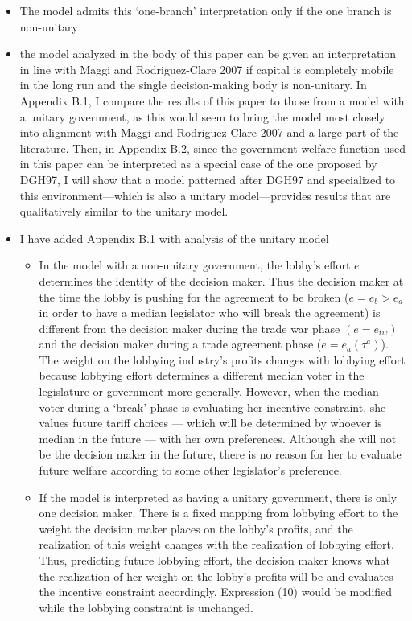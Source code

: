 \documentclass[12pt]{article}
\begin{document}
\begin{itemize}
\begin{itemize}
				\item The model admits this `one-branch' interpretation only if the one branch is non-unitary
				\item the model analyzed in the body of this paper can be given an interpretation in line with Maggi and Rodriguez-Clare 2007 if capital is completely mobile in the long run and the single decision-making body is non-unitary. In Appendix B.1, I compare the results of this paper to those from a model with a unitary government, as this would seem to bring the model most closely into alignment with Maggi and Rodriguez-Clare 2007 and a large part of the literature. Then, in Appendix B.2, since the government welfare function used in this paper can be interpreted as a special case of the one proposed by DGH97, I will show that a model patterned after DGH97 and specialized to this environment---which is also a unitary model---provides results that are qualitatively similar to the unitary model.
				\item I have added Appendix B.1 with analysis of the unitary model
					\begin{itemize}
						\item In the model with a non-unitary government, the lobby's effort $e$ determines the identity of the decision maker. Thus the decision maker at the time the lobby is pushing for the agreement to be broken ($e=e_b>e_a$ in order to have a median legislator who will break the agreement) is different from the decision maker during the trade war phase $(e = e_{tw})$ and the decision maker during a trade agreement phase ($e=e_a(\tau^a)$). The weight on the lobbying industry's profits changes with lobbying effort because lobbying effort determines a different median voter in the legislature or government more generally. However, when the median voter during a `break' phase is evaluating her incentive constraint, she values future tariff choices --- which will be determined by whoever is median in the future --- with her own preferences. Although she will not be the decision maker in the future, there is no reason for her to evaluate future welfare according to some other legislator's preference.
						\item If the model is interpreted as having a unitary government, there is only one decision maker. There is a fixed mapping from lobbying effort to the weight the decision maker places on the lobby's profits, and the realization of this weight changes with the realization of lobbying effort. Thus, predicting future lobbying effort, the decision maker knows what the realization of her weight on the lobby's profits will be and evaluates the incentive constraint accordingly. Expression (10) would be modified while the lobbying constraint is unchanged.

\end{itemize}
\end{itemize}
\end{itemize}
\end{document}
